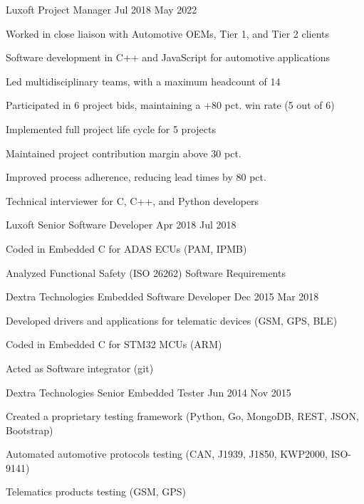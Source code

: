 \documentclass{resume} %
\begin{document}
\job
    {Luxoft}
    {Project Manager}
    {Jul 2018}
    {May 2022}
    {}
    {
    \begin{itemize-bullets}
    \item{Worked in close liaison with Automotive OEMs, Tier 1, and Tier 2 clients}
    \item{Software development in C++ and JavaScript for automotive applications}
    \item{Led multidisciplinary teams, with a maximum headcount of 14}
    \item{Participated in 6 project bids, maintaining a +80 pct. win rate (5 out of 6)}
    \item{Implemented full project life cycle for 5 projects}
    \item{Maintained project contribution margin above 30 pct.}
    \item{Improved process adherence, reducing lead times by 80 pct.}
    \item{Technical interviewer for C, C++, and Python developers}
    \end{itemize-bullets}
    }


\job
    {Luxoft}
    {Senior Software Developer}
    {Apr 2018}
    {Jul 2018}
    {}
    {
    \begin{itemize-bullets}
    \item{Coded in Embedded C for ADAS ECUs (PAM, IPMB)}
    \item{Analyzed Functional Safety (ISO 26262) Software Requirements}
    \end{itemize-bullets}
    }


\job
    {Dextra Technologies}
    {Embedded Software Developer}
    {Dec 2015}
    {Mar 2018}
    {}
    {
    \begin{itemize-bullets}
    \item{Developed drivers and applications for telematic devices (GSM, GPS, BLE)}
    \item{Coded in Embedded C for STM32 MCUs (ARM)}
    \item{Acted as Software integrator (git)}
    \end{itemize-bullets}
    }


\job
    {Dextra Technologies}
    {Senior Embedded Tester}
    {Jun 2014}
    {Nov 2015}
    {}
    {
    \begin{itemize-bullets}
    \item{Created a proprietary testing framework (Python, Go, MongoDB, REST, JSON, Bootstrap)}
    \item{Automated automotive protocols testing (CAN, J1939, J1850, KWP2000, ISO-9141)}
    \item{Telematics products testing (GSM, GPS)}
    \end{itemize-bullets}
    }
\end{document}
